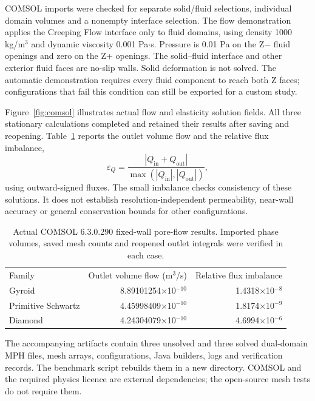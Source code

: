 \documentclass[preprint,12pt,a4paper]{elsarticle}
\begin{document}
COMSOL imports were checked for separate solid/fluid selections, individual domain volumes and a nonempty interface selection. The flow demonstration applies the Creeping Flow interface only to fluid domains, using density 1000 kg/m$^3$ and dynamic viscosity 0.001 Pa$\cdot$s. Pressure is 0.01 Pa on the Z$-$ fluid openings and zero on the Z+ openings. The solid--fluid interface and other exterior fluid faces are no-slip walls. Solid deformation is not solved. The automatic demonstration requires every fluid component to reach both Z faces; configurations that fail this condition can still be exported for a custom study.

Figure~\ref{fig:comsol} illustrates actual flow and elasticity solution fields. All three stationary calculations completed and retained their results after saving and reopening. Table~\ref{tab:flow} reports the outlet volume flow and the relative flux imbalance,
\begin{equation}\varepsilon_Q=\frac{|Q_{\mathrm{in}}+Q_{\mathrm{out}}|}{\max(|Q_{\mathrm{in}}|,|Q_{\mathrm{out}}|)},\end{equation}
using outward-signed fluxes. The small imbalance checks consistency of these solutions. It does not establish resolution-independent permeability, near-wall accuracy or general conservation bounds for other configurations.

\begin{table}[!htbp]
\centering\footnotesize
\caption{Actual COMSOL 6.3.0.290 fixed-wall pore-flow results. Imported phase volumes, saved mesh counts and reopened outlet integrals were verified in each case.}
\label{tab:flow}
\begin{tabular}{@{}lrr@{}}
\toprule
Family & Outlet volume flow (m$^3$/s) & Relative flux imbalance \\
Gyroid & 8.89101254$\times$10$^{-10}$ & 1.4318$\times$10$^{-8}$ \\
Primitive Schwartz & 4.45998409$\times$10$^{-10}$ & 1.8174$\times$10$^{-9}$ \\
Diamond & 4.24304079$\times$10$^{-10}$ & 4.6994$\times$10$^{-6}$ \\
\bottomrule
\end{tabular}
\end{table}

The accompanying artifacts contain three unsolved and three solved dual-domain MPH files, mesh arrays, configurations, Java builders, logs and verification records. The benchmark script rebuilds them in a new directory. COMSOL and the required physics licence are external dependencies; the open-source mesh tests do not require them.
\end{document}
